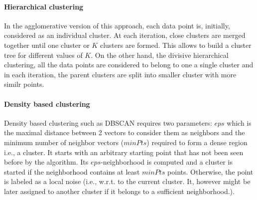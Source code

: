 \documentclass{article}
\begin{document}
\paragraph{Hierarchical clustering} \cite{murtagh2014ward} In the agglomerative version of this approach, each data point is, initially, considered as an individual cluster. At each iteration, close clusters are merged together until one cluster or $K$ clusters are formed. This allows to build a cluster tree for different values of $K$. On the other hand, the divisive hierarchical clustering, all the data points  are considered to belong to one a single cluster and in each iteration, the parent clusters are split into smaller cluster with more similr points.

\paragraph{Density based clustering} Density based clustering such as DBSCAN \cite{ester1996density} requires two parameters: $eps$ which is the maximal distance between 2 vectors to consider them as neighbors and the minimum number of neighbor vectors ($minPts$) required to form a dense region i.e., a cluster. It starts with an arbitrary starting point that has not been seen before by the algorithm. Its $eps$-neighborhood is computed and  a cluster is started if the neighborhood contains at least $minPts$ points. Otherwise, the point is labeled as a local noise (i.e., w.r.t. to the current cluster. It, however might be later assigned to another cluster if it belongs to a sufficient neighborhood.).
\end{document}
